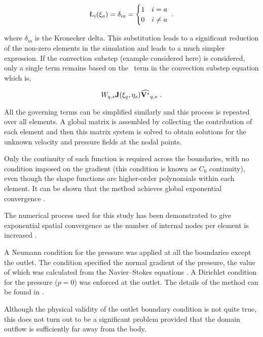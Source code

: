  \begin{gather}
 \label{eq:kronecker}
 \L_{i}(\compone_{a}) = \delta_{ia} = \begin{cases}
 1 & i = a    \\
 0 & i \neq a \\
 \end{cases} ~.
 \end{gather}
 
 where $\delta_{ia}$ is the Kronecker delta. This substitution leads to a significant reduction of the non-zero elements in the simulation and leads to a much simpler expression. If the convection substep (example considered here) is considered, only a single term remains based on the \Vint\ term in the convection substep equation which is,


 \begin{equation} \centering
 W_{q,s}\jacobian(\compone_{q},\comptwo_{s})\widehat{\Vint}_{q,s} ~.
 \end{equation}
 
 
 All the governing terms can be simplified similarly and this process is repeated over all elements. A global matrix is assembled by collecting the contribution of each element and then this matrix system is solved to obtain solutions for the unknown velocity and pressure fields at the nodal points. 
 
 Only the continuity of each function is required across the boundaries, with no condition imposed on the gradient (this condition
 is known as $C_{0}$ continuity), even though the shape functions are higher-order polynomials within each element. It can be shown that the method achieves global exponential convergence \citep{karniadakis2005}.  
 
 The numerical process used for this study has been demonstrated to give
 exponential spatial convergence as the number of internal nodes per
 element is increased \citep{Thompson1996a}.
 



A Neumann condition for the pressure was applied at all the boundaries except the outlet. The condition specified the normal gradient of the pressure, the value of which was calculated from the Navier--Stokes equations \citep{gresho1987}. A Dirichlet condition for the pressure ($p=0$) was enforced at the outlet. The details of the method can be found in \citet{Thompson2006,Thompson1996a}.

 Although the physical validity of the outlet boundary condition is not quite true, this does not turn out to be a significant problem provided that the domain outflow is sufficiently far away from the body.

